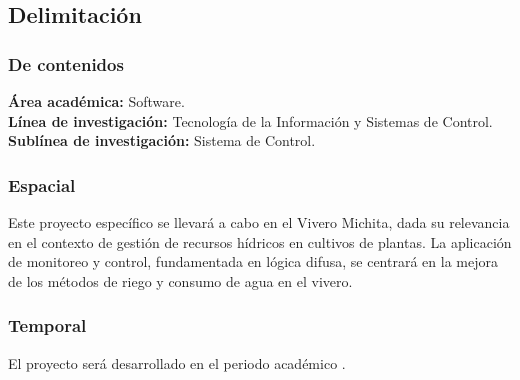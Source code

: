 \subsection{Delimitación}

\subsubsection{De contenidos}
\textbf{Área académica: } Software.\\
\textbf{Línea de investigación: } Tecnología de la Información y Sistemas de Control. \\
\textbf{Sublínea de investigación: } Sistema de Control.

\subsubsection{Espacial}
Este proyecto específico se llevará a cabo en el Vivero Michita, dada su relevancia en el contexto de gestión de recursos hídricos en cultivos de plantas. La aplicación de monitoreo y control, fundamentada en lógica difusa, se centrará en la mejora de los métodos de riego y consumo de agua en el vivero.

\subsubsection{Temporal}
El proyecto será desarrollado en el periodo académico \periodo.